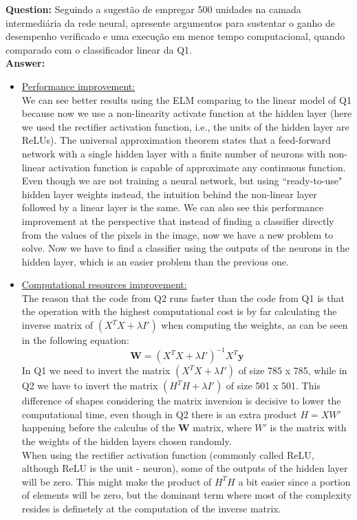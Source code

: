 \documentclass[a4paper]{article}    %
\begin{document}
\textbf{Question:} \newline
Seguindo a sugestão de empregar 500 unidades na camada intermediária da rede neural, apresente argumentos para sustentar o ganho de desempenho verificado e uma execução em menor tempo computacional, quando comparado com o classificador linear da Q1.
\vspace{5mm}
\textbf{\\Answer:}
\begin{itemize}
    \item \underline{Performance improvement:}\vspace{5pt}\\
        We can see better results using the ELM comparing to the linear model of Q1 because now we use a non-linearity activate function at the hidden layer (here we used the rectifier activation function, i.e., the units of the hidden layer are ReLUs). The universal approximation theorem states that a feed-forward network with a single hidden layer with a finite number of neurons with non-linear activation function is capable of approximate any continuous function. Even though we are not training a neural network, but using ``ready-to-use" hidden layer weights instead, the intuition behind the non-linear layer followed by a linear layer is the same. We can also see this performance improvement at the perspective that instead of finding a classifier directly from the values of the pixels in the image, now we have a new problem to solve. Now we have to find a classifier using the outputs of the neurons in the hidden layer, which is an easier problem than the previous one.

    \item \underline{Computational resources improvement:}\vspace{5pt}\\
    The reason that the code from Q2 runs faster than the code from Q1 is that the operation with the highest computational cost is by far calculating the inverse matrix of $(X^T X + \lambda I')$ when computing the weights, as can be seen in the following equation:
    \[{\textbf{W} = (X^T X + \lambda I')^{-1} X^T \textbf{y}}\]
    In Q1 we need to invert the matrix $(X^T X + \lambda I')$ of size 785 x 785, while in Q2 we have to invert the matrix $(H^T H + \lambda I')$ of size 501 x 501. This difference of shapes considering the matrix inversion is decisive to lower the computational time, even though in Q2 there is an extra product $H = X W'$ happening before the calculus of the \textbf{W} matrix, where $W'$ is the matrix with the weights of the hidden layers chosen randomly.\\
    When using the rectifier activation function (commonly called ReLU, although ReLU is the unit - neuron), some of the outputs of the hidden layer will be zero. This might make the product of $H^T H$ a bit easier since a portion of elements will be zero, but the dominant term where most of the complexity resides is definetely at the computation of the inverse matrix.
\end{itemize}
\end{document}
